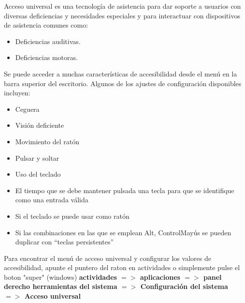 \documentclass[12pt,letterpaper]{book}
\begin{document}
Acceso universal es una tecnología de asistencia para dar soporte a usuarios con diversas deficiencias y necesidades especiales y para interactuar con dispositivos de asistencia comunes como:
\begin{itemize}
\item Deficiencias auditivas.
\item Deficiencias motoras.
\end{itemize} 
Se puede acceder a muchas características de accesibilidad desde el menú en la barra superior del escritorio.
Algunos de los ajustes de configuración disponibles incluyen:
\begin{itemize}
\item Ceguera
\item Visión deficiente
\item Movimiento del ratón
\item Pulsar y soltar
\item Uso del teclado
\item El tiempo que se debe mantener pulsada una tecla para que se identifique como
una entrada válida
\item Si el teclado se puede usar como ratón
\item Si las combinaciones en las que se emplean Alt, ControlMayús se pueden duplicar con “teclas persistentes”
\end{itemize}
Para encontrar el menú de acceso universal y configurar los valores de accesibilidad, apunte el puntero del raton en actividades o simplemente pulse el boton "super" (windows) {\bf actividades $=>$ aplicaciones $=>$ panel derecho herramientas del sistema $=>$ Configuración del sistema $=>$ Acceso universal}\\
\end{document}
